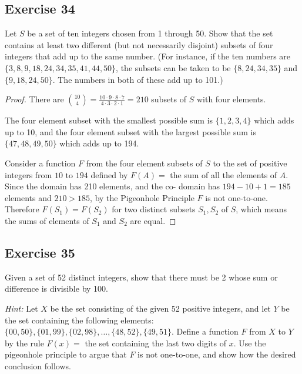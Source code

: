 \documentclass[14pt]{extarticle}
\begin{document}
\subsection{Exercise 34}
Let \(S\) be a set of ten integers chosen from 1 through 50. Show that the set contains at least two different (but
not necessarily disjoint) subsets of four integers that add up to the same number. (For instance, if the ten numbers
are \(\{3, 8, 9, 18, 24, 34, 35, 41, 44, 50\}\), the subsets can be taken to be \(\{8, 24, 34, 35\}\) and
\(\{9, 18, 24, 50\}\). The numbers in both of these add up to 101.)

\begin{proof}
     There are \(\binom{10}{4} = \frac{10 \cdot 9 \cdot 8 \cdot 7}{4 \cdot 3 \cdot 2 \cdot 1} = 210\) subsets of \(S\) with
     four elements.

     The four element subset with the smallest possible sum is \(\{1,2,3,4\}\) which adds up to 10, and the four element
     subset with the largest possible sum is \(\{47,48,49,50\}\) which adds up to 194.

     Consider a function \(F\) from the four element subsets of \(S\) to the set of positive integers from \(10\) to
     \(194\) defined by \(F(A) = \) the sum of all the elements of \(A\). Since the domain has 210 elements, and the co-
     domain has \(194-10+1 = 185\) elements and \(210 > 185\), by the Pigeonhole Principle \(F\) is not one-to-one.
     Therefore \(F(S_1) = F(S_2)\) for two distinct subsets \(S_1, S_2\) of \(S\), which means the sums of elements of
     \(S_1\) and \(S_2\) are equal.
\end{proof}

\subsection{Exercise 35}
Given a set of 52 distinct integers, show that there must be 2 whose sum or difference is divisible by 100.

     {\it Hint:} Let \(X\) be the set consisting of the given 52 positive integers, and let \(Y\) be the set containing the
following elements: \(\{00, 50\}, \{01, 99\}, \{02, 98\}, \ldots, \{48, 52\}, \{49, 51\}\). Define a function \(F\)
from \(X\) to \(Y\) by the rule \(F(x) =\) the set containing the last two digits of \(x\). Use the pigeonhole
principle to argue that \(F\) is not one-to-one, and show how the desired conclusion follows.
\end{document}
